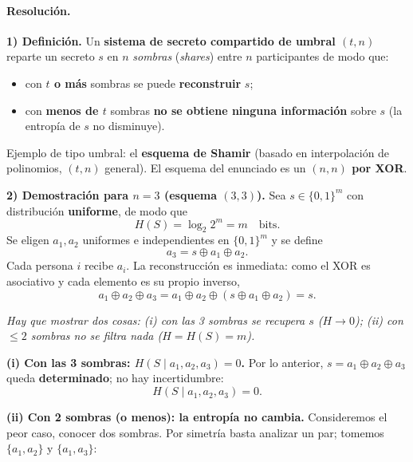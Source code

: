 \paragraph{Resolución.}

\textbf{1) Definición.} Un \textbf{sistema de secreto compartido de umbral $(t,n)$} reparte un
secreto $s$ en $n$ \emph{sombras} (\emph{shares}) entre $n$ participantes de modo que:
\begin{itemize}[leftmargin=1.4em,itemsep=1pt]
  \item con \textbf{$t$ o más} sombras se puede \textbf{reconstruir} $s$;
  \item con \textbf{menos de $t$} sombras \textbf{no se obtiene ninguna información} sobre $s$
        (la entropía de $s$ no disminuye).
\end{itemize}
Ejemplo de tipo umbral: el \textbf{esquema de Shamir} (basado en interpolación de polinomios,
$(t,n)$ general). El esquema del enunciado es un \textbf{$(n,n)$ por XOR}.

\medskip
\textbf{2) Demostración para $n=3$ (esquema $(3,3)$).} Sea $s\in\{0,1\}^m$ con distribución
\textbf{uniforme}, de modo que
\begin{equation*}
H(S) = \log_2 2^m = m \quad\text{bits}.
\end{equation*}
Se eligen $a_1, a_2$ uniformes e independientes en $\{0,1\}^m$ y se define
\begin{equation*}
a_3 = s \oplus a_1 \oplus a_2 .
\end{equation*}
Cada persona $i$ recibe $a_i$. La reconstrucción es inmediata: como el XOR es asociativo y cada
elemento es su propio inverso,
\begin{equation*}
a_1 \oplus a_2 \oplus a_3 = a_1 \oplus a_2 \oplus (s \oplus a_1 \oplus a_2) = s .
\end{equation*}

\noindent\textit{Hay que mostrar dos cosas: (i) con las 3 sombras se recupera $s$ ($H\to 0$); (ii)
con $\le 2$ sombras no se filtra nada ($H = H(S) = m$).}

\smallskip
\noindent\textbf{(i) Con las 3 sombras: $H(S\mid a_1,a_2,a_3)=0$.} Por lo anterior,
$s=a_1\oplus a_2\oplus a_3$ queda \textbf{determinado}; no hay incertidumbre:
\begin{equation*}
H(S \mid a_1, a_2, a_3) = 0 .
\end{equation*}

\smallskip
\noindent\textbf{(ii) Con 2 sombras (o menos): la entropía no cambia.} Consideremos el peor caso,
conocer dos sombras. Por simetría basta analizar un par; tomemos $\{a_1,a_2\}$ y
$\{a_1,a_3\}$:

